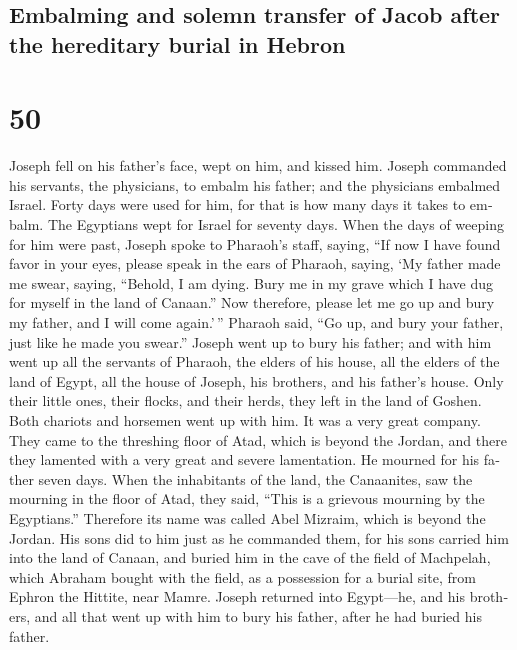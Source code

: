 \begin{paracol}{2}
\begin{otherlanguage}{english}
\hypertarget{embalming-and-solemn-transfer-of-jacob-after-the-hereditary-burial-in-hebron}{%
\subsection{Embalming and solemn transfer of Jacob after the hereditary
burial in
Hebron}\label{embalming-and-solemn-transfer-of-jacob-after-the-hereditary-burial-in-hebron}}

\hypertarget{section-99}{%
\section{50}\label{section-99}}

 Joseph fell on his father's face, wept on him, and kissed
him.  Joseph commanded his servants, the physicians, to
embalm his father; and the physicians embalmed Israel. 
Forty days were used for him, for that is how many days it takes to
embalm. The Egyptians wept for Israel for seventy days. 
When the days of weeping for him were past, Joseph spoke to Pharaoh's
staff, saying, ``If now I have found favor in your eyes, please speak in
the ears of Pharaoh, saying,  `My father made me swear,
saying, ``Behold, I am dying. Bury me in my grave which I have dug for
myself in the land of Canaan.'' Now therefore, please let me go up and
bury my father, and I will come again.'\,''  Pharaoh said,
``Go up, and bury your father, just like he made you swear.''
 Joseph went up to bury his father; and with him went up
all the servants of Pharaoh, the elders of his house, all the elders of
the land of Egypt,  all the house of Joseph, his brothers,
and his father's house. Only their little ones, their flocks, and their
herds, they left in the land of Goshen.  Both chariots and
horsemen went up with him. It was a very great company. 
They came to the threshing floor of Atad, which is beyond the Jordan,
and there they lamented with a very great and severe lamentation. He
mourned for his father seven days.  When the inhabitants
of the land, the Canaanites, saw the mourning in the floor of Atad, they
said, ``This is a grievous mourning by the Egyptians.'' Therefore its
name was called Abel Mizraim, which is beyond the Jordan.
 His sons did to him just as he commanded them,
 for his sons carried him into the land of Canaan, and
buried him in the cave of the field of Machpelah, which Abraham bought
with the field, as a possession for a burial site, from Ephron the
Hittite, near Mamre.  Joseph returned into Egypt---he,
and his brothers, and all that went up with him to bury his father,
after he had buried his father.


\end{otherlanguage}
\end{paracol}
